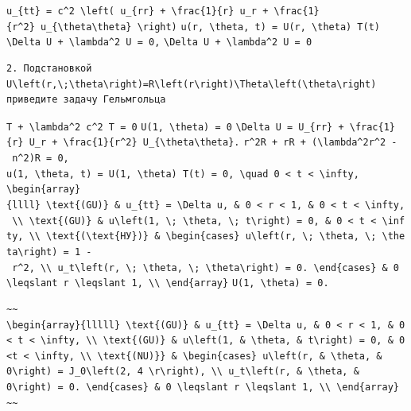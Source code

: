 \documentclass[
  ukrainian,
]{article}
\begin{document}
\texttt{u\_\{tt\}\ =\ c\^{}2\ \textbackslash{}left(\ u\_\{rr\}\ +\ \textbackslash{}frac\{1\}\{r\}\ u\_r\ +\ \textbackslash{}frac\{1\}\{r\^{}2\}\ u\_\{\textbackslash{}theta\textbackslash{}theta\}\ \textbackslash{}right)}
\texttt{u(r,\ \textbackslash{}theta,\ t)\ =\ U(r,\ \textbackslash{}theta)\ T(t)}
\texttt{\textbackslash{}Delta\ U\ +\ \textbackslash{}lambda\^{}2\ U\ =\ 0,}
\texttt{\textbackslash{}Delta\ U\ +\ \textbackslash{}lambda\^{}2\ U\ =\ 0}

\begin{verbatim}
2. Подстановкой  U\left(r,\;\theta\right)=R\left(r\right)\Theta\left(\theta\right)  приведите задачу Гельмгольца
\end{verbatim}

\texttt{T\textquotesingle{}\textquotesingle{}\ +\ \textbackslash{}lambda\^{}2\ c\^{}2\ T\ =\ 0}
\texttt{U(1,\ \textbackslash{}theta)\ =\ 0}
\texttt{\textbackslash{}Delta\ U\ =\ U\_\{rr\}\ +\ \textbackslash{}frac\{1\}\{r\}\ U\_r\ +\ \textbackslash{}frac\{1\}\{r\^{}2\}\ U\_\{\textbackslash{}theta\textbackslash{}theta\}.}
\texttt{r\^{}2R\textquotesingle{}\textquotesingle{}\ +\ rR\textquotesingle{}\ +\ (\textbackslash{}lambda\^{}2r\^{}2\ -\ n\^{}2)R\ =\ 0,}
\texttt{u(1,\ \textbackslash{}theta,\ t)\ =\ U(1,\ \textbackslash{}theta)\ T(t)\ =\ 0,\ \textbackslash{}quad\ 0\ \textless{}\ t\ \textless{}\ \textbackslash{}infty,}
\texttt{\textbackslash{}begin\{array\}\{llll\}\ \textbackslash{}text\{(GU)\}\ \&\ u\_\{tt\}\ =\ \textbackslash{}Delta\ u,\ \&\ 0\ \textless{}\ r\ \textless{}\ 1,\ \&\ 0\ \textless{}\ t\ \textless{}\ \textbackslash{}infty,\ \textbackslash{}\textbackslash{}\ \textbackslash{}text\{(GU)\}\ \&\ u\textbackslash{}left(1,\ \textbackslash{};\ \textbackslash{}theta,\ \textbackslash{};\ t\textbackslash{}right)\ =\ 0,\ \&\ 0\ \textless{}\ t\ \textless{}\ \textbackslash{}infty,\ \textbackslash{}\textbackslash{}\ \textbackslash{}text\{(\textbackslash{}text\{НУ\})\}\ \&\ \textbackslash{}begin\{cases\}\ u\textbackslash{}left(r,\ \textbackslash{};\ \textbackslash{}theta,\ \textbackslash{};\ \textbackslash{}theta\textbackslash{}right)\ =\ 1\ -\ r\^{}2,\ \textbackslash{}\textbackslash{}\ u\_t\textbackslash{}left(r,\ \textbackslash{};\ \textbackslash{}theta,\ \textbackslash{};\ \textbackslash{}theta\textbackslash{}right)\ =\ 0.\ \textbackslash{}end\{cases\}\ \&\ 0\ \textbackslash{}leqslant\ r\ \textbackslash{}leqslant\ 1,\ \textbackslash{}\textbackslash{}\ \textbackslash{}end\{array\}}
\texttt{U(1,\ \textbackslash{}theta)\ =\ 0.}

\begin{verbatim}
~~
\begin{array}{lllll} \text{(GU)} & u_{tt} = \Delta u, & 0 < r < 1, & 0 < t < \infty, \\ \text{(GU)} & u\left(1, & \theta, & t\right) = 0, & 0 <t < \infty, \\ \text{(NU)}} & \begin{cases} u\left(r, & \theta, & 0\right) = J_0\left(2, 4 \r\right), \\ u_t\left(r, & \theta, & 0\right) = 0. \end{cases} & 0 \leqslant r \leqslant 1, \\ \end{array}
~~
\end{verbatim}
\end{document}
